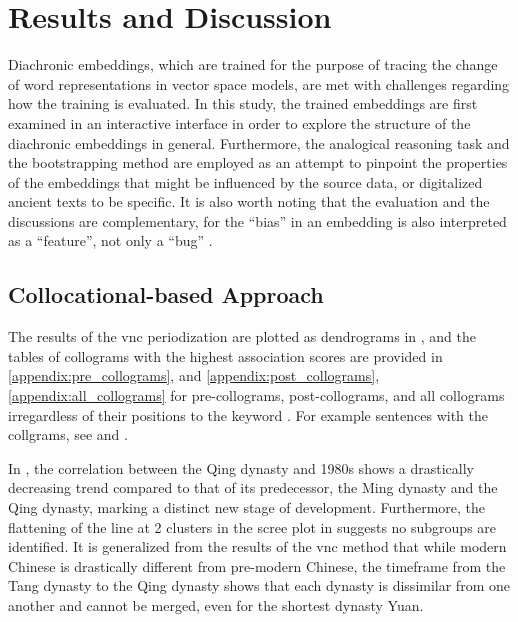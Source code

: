 

\chapter{Results and Discussion}
\label{results}
Diachronic embeddings, which are trained for the purpose of tracing the change of word representations in vector space models, are met with challenges regarding how the training is evaluated. In this study, the trained embeddings are first examined in an interactive interface in order to explore the structure of the diachronic embeddings in general. Furthermore, the analogical reasoning task and the bootstrapping method are employed as an attempt to pinpoint the properties of the embeddings that might be influenced by the source data, or digitalized ancient texts to be specific. It is also worth noting that the evaluation and the discussions are complementary, for the ``bias'' in an embedding is also interpreted as a ``feature'', not only a ``bug'' \parencite{wevers2020digital}.

\section{Collocational-based Approach}
\label{results_collocational}
The results of the \gls{vnc} periodization are plotted as dendrograms in , and the tables of collograms with the highest association scores are provided in \ref{appendix:pre_collograms}, and \ref{appendix:post_collograms}, \ref{appendix:all_collograms} for pre-collograms, post-collograms, and all collograms irregardless of their positions to the keyword \jia\rspace. For example sentences with the collgrams, see  and .

In , the correlation between the Qing dynasty and 1980s shows a drastically decreasing trend compared to that of its predecessor, the Ming dynasty and the Qing dynasty, marking a distinct new stage of development. Furthermore, the flattening of the line at 2 clusters in the scree plot in  suggests no subgroups are identified. It is generalized from the results of the \gls{vnc} method that while modern Chinese is drastically different from pre-modern Chinese, the timeframe from the Tang dynasty to the Qing dynasty shows that each dynasty is dissimilar from one another and cannot be merged, even for the shortest dynasty Yuan.

